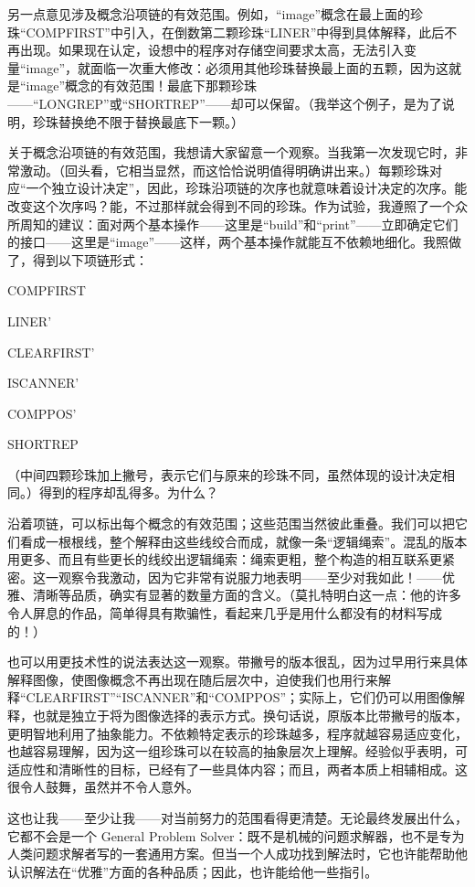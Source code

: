 另一点意见涉及概念沿项链的有效范围。例如，“image”概念在最上面的珍珠“COMPFIRST”中引入，在倒数第二颗珍珠“LINER”中得到具体解释，此后不再出现。如果现在认定，设想中的程序对存储空间要求太高，无法引入变量“image”，就面临一次重大修改：必须用其他珍珠替换最上面的五颗，因为这就是“image”概念的有效范围！最底下那颗珍珠——“LONGREP”或“SHORTREP”——却可以保留。（我举这个例子，是为了说明，珍珠替换绝不限于替换最底下一颗。）

关于概念沿项链的有效范围，我想请大家留意一个观察。当我第一次发现它时，非常激动。（回头看，它相当显然，而这恰恰说明值得明确讲出来。）每颗珍珠对应“一个独立设计决定”，因此，珍珠沿项链的次序也就意味着设计决定的次序。能改变这个次序吗？能，不过那样就会得到不同的珍珠。作为试验，我遵照了一个众所周知的建议：面对两个基本操作——这里是“build”和“print”——立即确定它们的接口——这里是“image”——这样，两个基本操作就能互不依赖地细化。我照做了，得到以下项链形式：

COMPFIRST

LINER'

CLEARFIRST'

ISCANNER'

COMPPOS'

SHORTREP

\noindent
（中间四颗珍珠加上撇号，表示它们与原来的珍珠不同，虽然体现的设计决定相同。）得到的程序却乱得多。为什么？

沿着项链，可以标出每个概念的有效范围；这些范围当然彼此重叠。我们可以把它们看成一根根线，整个解释由这些线绞合而成，就像一条“逻辑绳索”。混乱的版本用更多、而且有些更长的线绞出逻辑绳索：绳索更粗，整个构造的相互联系更紧密。这一观察令我激动，因为它非常有说服力地表明——至少对我如此！——优雅、清晰等品质，确实有显著的数量方面的含义。（莫扎特明白这一点：他的许多令人屏息的作品，简单得具有欺骗性，看起来几乎是用什么都没有的材料写成的！）

也可以用更技术性的说法表达这一观察。带撇号的版本很乱，因为过早用行来具体解释图像，使图像概念不再出现在随后层次中，迫使我们也用行来解释“CLEARFIRST”“ISCANNER”和“COMPPOS”；实际上，它们仍可以用图像解释，也就是独立于将为图像选择的表示方式。换句话说，原版本比带撇号的版本，更明智地利用了抽象能力。不依赖特定表示的珍珠越多，程序就越容易适应变化，也越容易理解，因为这一组珍珠可以在较高的抽象层次上理解。经验似乎表明，可适应性和清晰性的目标，已经有了一些具体内容；而且，两者本质上相辅相成。这很令人鼓舞，虽然并不令人意外。

这也让我——至少让我——对当前努力的范围看得更清楚。无论最终发展出什么，它都不会是一个 General Problem Solver：既不是机械的问题求解器，也不是专为人类问题求解者写的一套通用方案。但当一个人成功找到解法时，它也许能帮助他认识解法在“优雅”方面的各种品质；因此，也许能给他一些指引。

